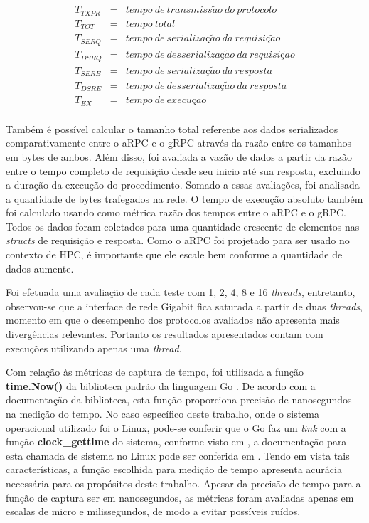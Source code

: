 \begin{eqnarray*} 
T_{TXPR} & = & tempo ~de ~transmiss\tilde{a}o ~do ~protocolo \\
T_{TOT}  & = & tempo ~total  \\
T_{SERQ} & = & tempo ~de ~serializa\textit{\c{c}}\tilde{a}o ~da ~requisi\textit{\c{c}}\tilde{a}o \\
T_{DSRQ} & = & tempo ~de  ~desserializa\textit{\c{c}}\tilde{a}o ~da ~requisi\text{\c{c}}\tilde{a}o  \\
T_{SERE} & = & tempo ~de ~serializa\textit{\c{c}}\tilde{a}o ~da ~resposta  \\
T_{DSRE} & = & tempo  ~de  ~desserializa\textit{\c{c}}\tilde{a}o ~da ~resposta  \\
T_{EX} & = &  tempo ~de ~execu\textit{\c{c}}\tilde{a}o  \\
\end{eqnarray*}

Também é possível calcular o tamanho total referente aos dados serializados comparativamente entre o aRPC e o gRPC através da razão entre os tamanhos em bytes de ambos. Além disso, foi avaliada a vazão de dados a partir da razão entre o tempo completo de requisição desde seu inicio até sua resposta, excluindo a duração da execução do procedimento. Somado a essas avaliações, foi analisada a quantidade de bytes trafegados na rede. O tempo de execução absoluto também foi calculado usando como métrica razão dos tempos entre o aRPC e o gRPC. Todos os dados foram coletados para uma quantidade crescente de elementos nas \textit{structs} de requisição e resposta. Como o aRPC foi projetado para ser usado no contexto de HPC, é importante que ele escale bem conforme a quantidade de dados aumente.

Foi efetuada uma avaliação de cada teste com 1, 2, 4, 8 e 16 \textit{threads}, entretanto, observou-se que a interface de rede Gigabit fica saturada a partir de duas \textit{threads}, momento em que o desempenho dos protocolos avaliados não apresenta mais divergências relevantes. Portanto os resultados apresentados contam com execuções utilizando apenas uma \textit{thread}.

Com relação às métricas de captura de tempo, foi utilizada a função \textbf{time.Now()} da biblioteca padrão da linguagem Go \cite{golang_time_2021}. De acordo com a documentação da biblioteca, esta função proporciona precisão de nanosegundos na medição do tempo. No caso específico deste trabalho, onde o sistema operacional utilizado foi o Linux, pode-se conferir que o Go faz um \textit{link} com a função \textbf{clock\_gettime} do sistema, conforme visto em \cite{golang_golanggo_2021}, a documentação para esta chamada de sistema no Linux pode ser conferida em \cite{linux_clock_getres2_2021}. Tendo em vista tais características, a função escolhida para medição de tempo apresenta acurácia necessária para os propósitos deste trabalho. Apesar da precisão de tempo para a função de captura ser em nanosegundos, as métricas foram avaliadas apenas em escalas de micro e milissegundos, de modo a evitar possíveis ruídos.

